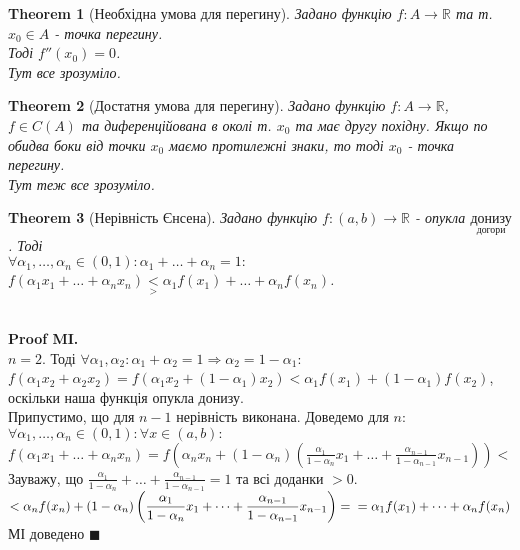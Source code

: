 \documentclass[a4paper, 14pt]{article}
\def\huge{\displaystyle}
\theoremstyle{theoremdd}
\newtheorem{theorem}{Theorem}[subsection]
\theoremstyle{theoremdd}
\theoremstyle{theoremdd}
\theoremstyle{theoremdd}
\theoremstyle{theoremdd}
\theoremstyle{theoremdd}
\theoremstyle{theoremdd}
\theoremstyle{theoremdd}
\newenvironment{pfMI}{\vspace*{-3mm} \textbf{\\ Proof MI. \\}}{\hfill $\blacksquare$}
\begin{document}
\begin{theorem}[Необхідна умова для перегину]
Задано функцію $f: A \to \mathbb{R}$ та т. $x_0 \in A$ - точка перегину.\\
Тоді $f''(x_0) = 0$.\\
\textit{Тут все зрозуміло.}
\end{theorem}

\begin{theorem}[Достатня умова для перегину]
Задано функцію $f: A \to \mathbb{R}$, $f \in C(A)$ та диференційована в околі т. $x_0$ та має другу похідну. Якщо по обидва боки від точки $x_0$ маємо протилежні знаки, то тоді $x_0$ - точка перегину.\\
\textit{Тут теж все зрозуміло.}
\end{theorem}

\begin{theorem}[Нерівність Єнсена]
Задано функцію $f:(a,b) \to \mathbb{R}$ - опукла $\underset{\textrm{догори}}{\textrm{донизу}}$. Тоді\\
$\forall \alpha_1, \dots, \alpha_n \in (0,1): \huge \alpha_1 + \dots + \alpha_n = 1:$\\
$\huge f(\alpha_1 x_1 + \dots + \alpha_n x_n) \underset{>}{<} \alpha_1 f(x_1) + \dots + \alpha_n f(x_n)$.
\end{theorem}

\begin{pfMI}
$n = 2$. Тоді $\forall \alpha_1, \alpha_2: \alpha_1 + \alpha_2 = 1 \Rightarrow \alpha_2 = 1- \alpha_1:$\\
$f(\alpha_1 x_2 + \alpha_2 x_2) = f(\alpha_1 x_2 + (1-\alpha_1)x_2) < \alpha_1 f(x_1) + (1-\alpha_1)f(x_2)$, оскільки наша функція опукла донизу.\\
Припустимо, що для $n-1$ нерівність виконана. Доведемо для $n$:\\
$\forall \alpha_1,\dots,\alpha_n \in (0,1): \forall x \in (a,b):$\\
$f(\alpha_1 x_1 + \dots + \alpha_n x_n) = \huge f\left(\alpha_n x_n + (1-\alpha_n)\left(\frac{\alpha_1}{1-\alpha_n}x_1 + \dots + \frac{\alpha_{n-1}}{1-\alpha_{n-1}}x_{n-1} \right)\right) <$\\
Зауважу, що $\huge \frac{\alpha_1}{1-\alpha_n} + \dots + \frac{\alpha_{n-1}}{1-\alpha_{n-1}} = 1$ та всі доданки $>0$.\\
$< \huge \alpha_n f(x_n) + (1-\alpha_n)\left(\frac{\alpha_1}{1-\alpha_n}x_1 + \dots + \frac{\alpha_{n-1}}{1-\alpha_{n-1}}x_{n-1} \right) = \\ = \alpha_1 f(x_1) + \dots + \alpha_n f(x_n)$\\
МІ доведено
\end{pfMI}
\end{document}
